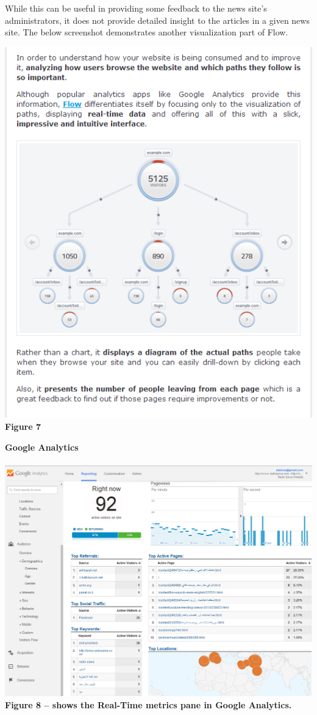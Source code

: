 \documentclass[12pt]{article}
\begin{document}
While this can be useful in providing some feedback to the news site's administrators, it does not provide detailed insight to the articles in a given news site. The below screenshot demonstrates another visualization part of Flow. \\

\vfill

\noindent\includegraphics[scale=0.7]{img/flow1} \\
\noindent\textbf{Figure 7} \\

\newpage


\noindent\textbf{Google Analytics} \\ \\
\noindent\includegraphics[scale=0.4]{img/google_analytics} \\
\noindent\textbf{Figure 8 -- shows the Real-Time metrics pane in Google Analytics.} \\
\end{document}

